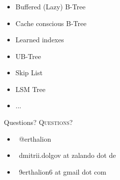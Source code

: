 \documentclass[usenames,dvipsnames, 18pt, compress, aspectratio=169]{beamer}
\def\twitter{{\FA \faTwitter}}
\def\email{{\FA \faEnvelope}}
\begin{document}
\begin{frame}[fragile]{}
    \frametitle{}

    \begin{center}
        \begin{itemize}[label={\MVRightarrow}]
            \item <+-> Buffered (Lazy) B-Tree
            \item <+-> Cache conscious B-Tree
            \item <+-> Learned indexes
            \item <+-> UB-Tree
            \item <+-> Skip List
            \item <+-> LSM Tree
            \item <+-> ...
        \end{itemize}
    \end{center}
\end{frame}

\fontsize{18pt}{18}\selectfont
\begin{frame}
  \vspace*{2.5cm}
  \begin{minipage}[b][\paperheight]{\textwidth}
  \begin{center}

      \linespread{1.0}%
      \if@noSmallCapitals%
        Questions?
      \else%
        \scshape{\color{black} Questions?}%
      \fi%
      \vspace*{0.3em}

      \fontsize{13pt}{14}\selectfont
        \begin{itemize}[label={}]
            \item {\color{black} \twitter\ @erthalion}
            \item {\color{black} \email\ dmitrii.dolgov at zalando dot de}
            \item {\color{black} \email\ 9erthalion6 at gmail dot com}
        \end{itemize}
      \vspace*{2.5em}%

    \vfill
    \vspace*{2em}
  \end{center}
  \end{minipage}

\end{frame}
\end{document}
